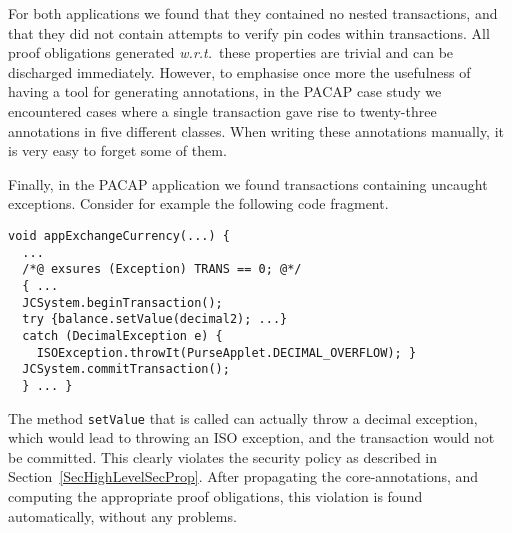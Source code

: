 For both applications we found that they contained no nested
transactions, and that they did not contain attempts to verify pin
codes within transactions. All proof obligations generated
\emph{w.r.t.}~these properties are trivial and can be discharged
immediately. However, to emphasise once more the usefulness of having
a tool for generating annotations, in the PACAP case study we
encountered cases where a single transaction gave rise to twenty-three
annotations in five different classes. When writing these annotations
manually, it is very easy to forget some of them.

Finally, in the PACAP application we found transactions containing
uncaught exceptions. Consider for example the following code fragment.
\begin{verbatim}
void appExchangeCurrency(...) { 
  ...
  /*@ exsures (Exception) TRANS == 0; @*/ 
  { ...
  JCSystem.beginTransaction();      
  try {balance.setValue(decimal2); ...}
  catch (DecimalException e) {
    ISOException.throwIt(PurseApplet.DECIMAL_OVERFLOW); }
  JCSystem.commitTransaction();
  } ... }
\end{verbatim}
The method \texttt{setValue} that is called can actually throw a
decimal exception, which would lead to throwing an ISO exception, and
the transaction would not be committed. This clearly violates the
security policy as described in
Section~\ref{SecHighLevelSecProp}. After propagating the
core-annotations, and computing the appropriate proof obligations,
this violation is found automatically, without any problems.

